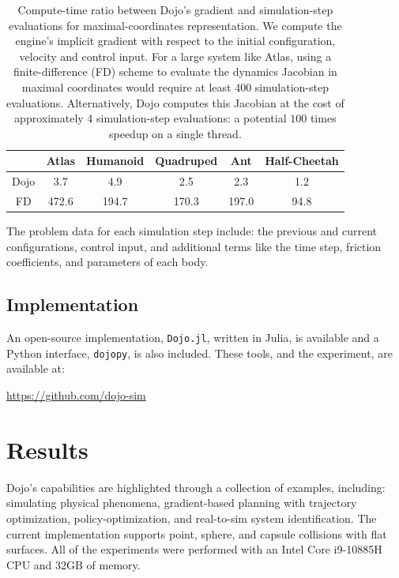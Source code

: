 \begin{table}[H]
	\centering
	\caption[Compute ratio for Dojo gradient computation and simulation steps with maximal-coordinates representation]{Compute-time ratio between Dojo's gradient and simulation-step evaluations for maximal-coordinates representation. We compute the engine's implicit gradient with respect to the initial configuration, velocity and control input. For a large system like Atlas, using a finite-difference (FD) scheme to evaluate the dynamics Jacobian in maximal coordinates would require at least 400 simulation-step evaluations. Alternatively, Dojo computes this Jacobian at the cost of approximately 4 simulation-step evaluations: a potential $100$ times speedup on a single thread.}
	\begin{tabular}{c c c c c c}
		\toprule
		\textbf{} & \textbf{Atlas} & \textbf{Humanoid} & \textbf{Quadruped} & \textbf{Ant} & \textbf{Half-Cheetah} \\
		\toprule
		Dojo & 3.7 & 4.9 & 2.5 & 2.3 & 1.2 \\
		FD & 472.6 & 194.7 & 170.3 & 197.0 & 94.8 \\
		\toprule
	\end{tabular}
	\label{dojo_compute_ratios}
\end{table}

The problem data for each simulation step include: the previous and current configurations, control input, and additional terms like the time step, friction coefficients, and parameters of each body. 

\subsection{Implementation}

An open-source implementation, \texttt{Dojo.jl}, written in Julia, is available and a Python interface, \texttt{dojopy}, is also included. These tools, and the experiment, are available at:
\begin{center}
\url{https://github.com/dojo-sim}
\end{center}

\section{Results} \label{dojo_results}
Dojo's capabilities are highlighted through a collection of examples, including: simulating physical phenomena, gradient-based planning with trajectory optimization, policy-optimization, and real-to-sim system identification. The current implementation supports point, sphere, and capsule collisions with flat surfaces. All of the experiments were performed with an Intel Core i9-10885H CPU and 32GB of memory.

